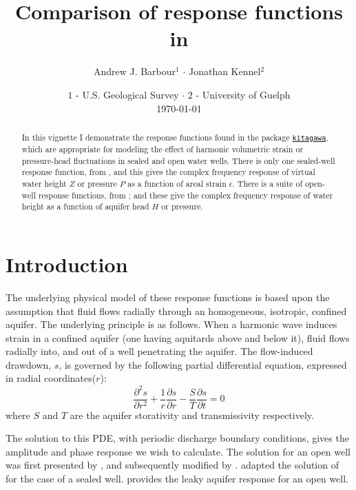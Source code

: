 \documentclass[12pt]{article}
\author{Andrew J. Barbour$^1$ $\cdot$ Jonathan Kennel$^2$}
\title{Comparison of response functions in \kit{}}
\date{%
    \footnotesize{$1$ - U.S. Geological Survey $\cdot$ $2$ - University of Guelph}\\[2ex]%
    \today
}
\begin{document}

%
\newcommand{\SC}[1]{\textsc{#1}}
\newcommand{\Rcmd}[1]{\texttt{#1}}
\newcommand{\kit}[0]{\href{https://github.com/abarbour/kitagawa/}{\color{blue}\Rcmd{kitagawa}}}
\newcommand{\bidxa}[1]{\index{#1}{\textbf{#1}}} 
\newcommand{\bidxb}[2]{\index{#2}{\textbf{#1}}} 
\newcommand{\idxa}[1]{\index{#1}{#1}} 
\newcommand{\idxb}[2]{\index{#2}{#1}} 
%
\maketitle
%
\begin{abstract}
In this vignette I demonstrate the response functions found in 
the package
\kit{}, which are appropriate for modeling the effect of
harmonic volumetric strain or pressure-head fluctuations in
sealed and open water wells.
There is only one sealed-well response function, from
\citet{kitagawa2011}, and this gives the complex frequency response of
virtual water height $Z$ or pressure $P$ as a function of
areal %
strain $\epsilon$.
There is a suite of open-well response functions, from 
\citet{cooper1965, hsieh1987, rojstaczer1988, liu1989, wang2018}; and
these give the complex frequency response of
water height as a function of aquifer head $H$ or pressure.
\end{abstract}
%
\tableofcontents

\section{Introduction}

 The underlying physical model of these response functions
 is based upon the assumption that fluid flows radially
 through an homogeneous, isotropic, confined aquifer.
%
 The underlying principle is as follows.  When a harmonic wave induces
 strain in a confined aquifer (one having aquitards above and below it), 
 fluid flows radially into, and out of a well penetrating the aquifer.
 The flow-induced drawdown, $s$, is governed by the following 
 partial differential equation, expressed in radial coordinates($r$):
\begin{equation}
 \frac{\partial^2 s}{\partial r^2} + \frac{1}{r} 
 \frac{\partial s}{ \partial r} - \frac{S}{T}\frac{\partial s}{\partial t} = 0
\end{equation}
 where $S$ and $T$ are the aquifer storativity and transmissivity respectively.
 
 The solution to this PDE, with periodic discharge boundary conditions,
 gives the amplitude and phase response we wish to calculate.
 The solution  for an open well was first presented by
 \citet{cooper1965}, and subsequently modified by \citet{rojstaczer1988, liu1989}.
 \citet{kitagawa2011} adapted the solution
 of \citet{hsieh1987} for the case of a sealed well. 
 \citet{wang2018} provides the leaky aquifer response for an open well.
 
\end{document}
